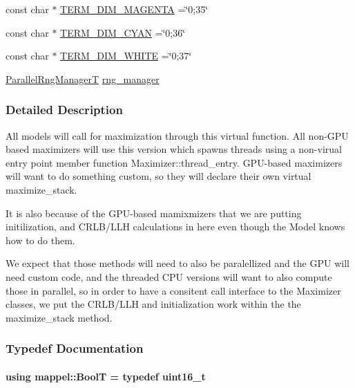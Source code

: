 \begin{DoxyCompactItemize}
\item 
const char $\ast$ \hyperlink{namespacemappel_add36264e8025d4db88e03897ecda89b5}{T\+E\+R\+M\+\_\+\+D\+I\+M\+\_\+\+M\+A\+G\+E\+N\+TA} =\char`\"{}0;35\char`\"{}
\item 
const char $\ast$ \hyperlink{namespacemappel_ad168ab0229814251071c6680e9792b0f}{T\+E\+R\+M\+\_\+\+D\+I\+M\+\_\+\+C\+Y\+AN} =\char`\"{}0;36\char`\"{}
\item 
const char $\ast$ \hyperlink{namespacemappel_a15d16c02d9b595b272213768978e691b}{T\+E\+R\+M\+\_\+\+D\+I\+M\+\_\+\+W\+H\+I\+TE} =\char`\"{}0;37\char`\"{}
\item 
\hyperlink{namespacemappel_acf276a4212f07b1ed4cb2ddce379ba1d}{Parallel\+Rng\+ManagerT} \hyperlink{namespacemappel_abe2a4321a80f2384995f3c288131d4c0}{rng\+\_\+manager}
\end{DoxyCompactItemize}


\subsubsection{Detailed Description}
All models will call for maximization through this virtual function. All non-\/\+G\+PU based maximizers will use this version which spawns threads using a non-\/virual entry point member function Maximizer\+::thread\+\_\+entry. G\+P\+U-\/based maximizers will want to do something custom, so they will declare their own virtual maximize\+\_\+stack.

It is also because of the G\+P\+U-\/based mamixmizers that we are putting initilization, and C\+R\+L\+B/\+L\+LH calculations in here even though the Model knows how to do them.

We expect that those methods will need to also be paralellized and the G\+PU will need custom code, and the threaded C\+PU versions will want to also compute those in parallel, so in order to have a consitent call interface to the Maximizer classes, we put the C\+R\+L\+B/\+L\+LH and initialization work within the the maximize\+\_\+stack method. 

\subsubsection{Typedef Documentation}
\paragraph[{\texorpdfstring{BoolT}{BoolT}}]{\setlength{\rightskip}{0pt plus 5cm}using {\bf mappel\+::\+BoolT} = typedef uint16\+\_\+t}\hypertarget{namespacemappel_a74f3ebfb073cdde8b57926847deb4daa}{}\label{namespacemappel_a74f3ebfb073cdde8b57926847deb4daa}


